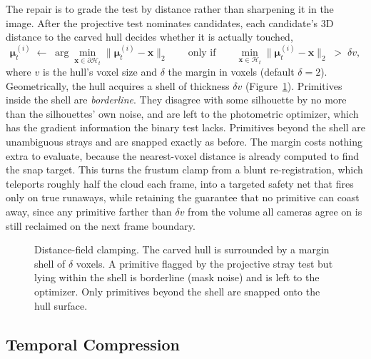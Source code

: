 The repair is to grade the test by distance rather than sharpening it in the
image. After the projective test nominates candidates, each candidate's 3D distance to
the carved hull decides whether it is actually touched,
\begin{equation}
    \boldsymbol{\mu}^{(i)}_t \;\leftarrow\;
    \arg\min_{\mathbf{x}\in\partial\mathcal{H}_t} \big\| \boldsymbol{\mu}^{(i)}_t - \mathbf{x} \big\|_2
    \qquad \text{only if} \qquad
    \min_{\mathbf{x}\in\mathcal{H}_t} \big\| \boldsymbol{\mu}^{(i)}_t - \mathbf{x} \big\|_2 \;>\; \delta v,
    \label{eq:snapmargin}
\end{equation}
where $v$ is the hull's voxel size and $\delta$ the margin in voxels (default
$\delta = 2$). Geometrically, the hull acquires a shell of thickness $\delta v$
(Figure~\ref{fig:snap-margin-tikz}). Primitives inside the shell are \emph{borderline}.
They disagree with some silhouette by no more than the silhouettes' own noise, and
are left to the photometric optimizer, which has the gradient information the binary
test lacks. Primitives beyond the shell are unambiguous strays and are snapped exactly
as before. The margin costs nothing extra to evaluate, because the nearest-voxel
distance is already computed to find the snap target. This turns the frustum clamp
from a blunt re-registration, which teleports roughly half the cloud each frame, into
a targeted safety net that fires only on true runaways, while retaining the guarantee
that no primitive can coast away, since any primitive farther than $\delta v$ from the
volume all cameras agree on is still reclaimed on the next frame boundary.

\begin{figure}[!ht]
    \centering
    
    \caption{Distance-field clamping. The carved hull is surrounded by a margin
    shell
    of $\delta$ voxels. A primitive flagged by the projective stray test but lying
    within the shell is borderline (mask noise) and is left to the optimizer. Only primitives beyond the shell are snapped onto the hull surface.}
    \label{fig:snap-margin-tikz}
\end{figure}

\subsection{Temporal Compression}
\label{sec:compression}

